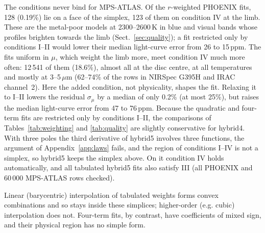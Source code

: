 \documentclass{aa}
\newcommand{\ppm}{\,\textrm{ppm}}
\begin{document}
The conditions never bind for MPS-ATLAS. Of the $r$-weighted PHOENIX fits,
128 (0.19\%) lie on a face of the simplex, 123 of them on condition IV at
the limb. These are the metal-poor models at 2300--2600\,K in blue and visual
bands whose profiles brighten towards the limb (Sect.~\ref{sec:quality});
a fit restricted only by conditions I--II would lower their median
light-curve error from 26 to 15\ppm. The fits uniform in $\mu$, which weight the limb
more, meet condition IV much more often: 12\,541 of them (18.6\%), almost all
at the disc centre, at all temperatures and mostly at 3--5\,$\mu$m (62--74\% of
the rows in NIRSpec G395H and IRAC channel~2). Here the added condition, not
physicality, shapes the fit. Relaxing it to I--II lowers the residual
$\sigma_\mu$ by a median of only 0.2\% (at most 25\%), but raises the median
light-curve error from 47 to 76\ppm. Because the quadratic
and four-term fits are restricted only by conditions I--II, the comparisons of
Tables~\ref{tab:weighting} and \ref{tab:quality} are slightly conservative for
hybrid4. With three poles the third derivative of hybrid5 involves three
functions, the argument of Appendix~\ref{app:laws} fails, and the region of
conditions I--IV is not a simplex, so hybrid5 keeps the simplex above. On it
condition IV holds automatically, and all tabulated hybrid5 fits also satisfy
III (all PHOENIX and 60\,000 MPS-ATLAS rows checked).

Linear (barycentric) interpolation of tabulated weights forms convex
combinations and so stays inside these simplices; higher-order (e.g. cubic)
interpolation does not. Four-term fits, by contrast, have coefficients of
mixed sign, and their physical region has no simple form.
\end{document}
